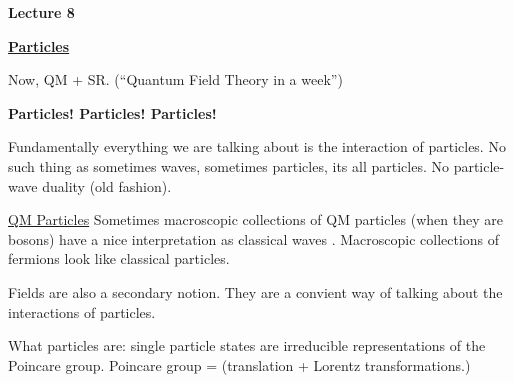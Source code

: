 
\usepackage{fancyhdr}

\fancyhf{}


\thispagestyle{fancy}

\begin{center}
{\huge \textbf{Lecture 8}}
\end{center}

{\fontsize{14}{16}\selectfont

\textbf{\underline{Particles}} 

Now, QM + SR.  (``Quantum Field Theory in a week'')

\begin{center}
\textbf{Particles! Particles! Particles! }
\end{center}


Fundamentally everything we are talking about is the interaction of particles.
No such thing as sometimes waves, sometimes particles, its all particles.
No particle-wave duality (old fashion).

\underline{QM Particles}
Sometimes macroscopic collections of QM particles (when they are bosons) have a nice interpretation as classical waves .
Macroscopic collections of fermions look like classical particles.


Fields are also a secondary notion.
They are a convient way of talking about the interactions of particles.

What particles are:
single particle states are irreducible representations of the Poincare group. 
Poincare group = (translation + Lorentz transformations.)

}
